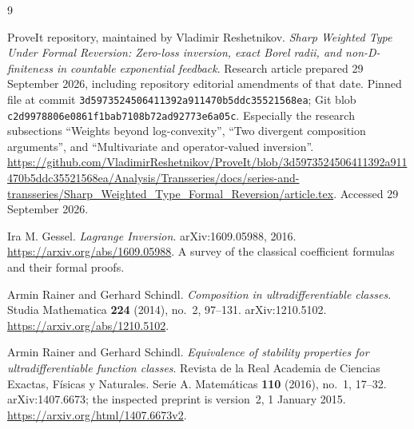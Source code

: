 \documentclass[11pt,a4paper]{article}
\numberwithin{equation}{section}
\theoremstyle{definition}
\theoremstyle{remark}
\begin{document}
\begin{thebibliography}{9}

ProveIt repository, maintained by Vladimir Reshetnikov.
\emph{Sharp Weighted Type Under Formal Reversion: Zero-loss inversion,
exact Borel radii, and non-D-finiteness in countable exponential feedback}.
Research article prepared 29 September 2026, including repository editorial
amendments of that date. Pinned file at commit
\nolinkurl{3d5973524506411392a911470b5ddc35521568ea}; Git blob
\nolinkurl{c2d9978806e0861f1bab7108b72ad92773e6a05c}.
Especially the research subsections ``Weights beyond log-convexity'',
``Two divergent composition arguments'', and ``Multivariate and
operator-valued inversion''.
\url{https://github.com/VladimirReshetnikov/ProveIt/blob/3d5973524506411392a911470b5ddc35521568ea/Analysis/Transseries/docs/series-and-transseries/Sharp_Weighted_Type_Formal_Reversion/article.tex}.
Accessed 29 September 2026.

Ira M. Gessel.
\emph{Lagrange Inversion}.
arXiv:1609.05988, 2016.
\url{https://arxiv.org/abs/1609.05988}.
A survey of the classical coefficient formulas and their formal proofs.

Armin Rainer and Gerhard Schindl.
\emph{Composition in ultradifferentiable classes}.
Studia Mathematica \textbf{224} (2014), no.~2, 97--131.
arXiv:1210.5102.
\url{https://arxiv.org/abs/1210.5102}.

Armin Rainer and Gerhard Schindl.
\emph{Equivalence of stability properties for ultradifferentiable
function classes}.
Revista de la Real Academia de Ciencias Exactas, F\'isicas y Naturales.
Serie A. Matem\'aticas \textbf{110} (2016), no.~1, 17--32.
arXiv:1407.6673; the inspected preprint is version~2, 1 January 2015.
\url{https://arxiv.org/html/1407.6673v2}.

\end{thebibliography}
\end{document}
